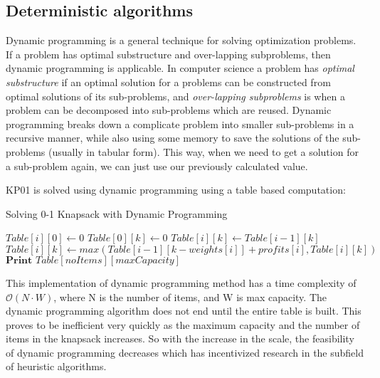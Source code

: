 \documentclass[titlepage]{article}
\begin{document}
\subsection*{Deterministic algorithms}
Dynamic programming is a general technique for solving optimization problems. If a problem has optimal substructure and over-lapping subproblems, then dynamic programming is applicable. In computer science 
a problem has \emph{optimal substructure} if an optimal solution for a problems can be constructed from optimal solutions of its sub-problems, and \emph{over-lapping subproblems} is when a problem can be decomposed into sub-problems which are reused. Dynamic programming breaks down a complicate problem into smaller sub-problems in a recursive manner, while also using some memory to save the solutions of the sub-problems (usually in tabular form). This way, when we need to get a solution for a sub-problem again, we can just use our previously calculated value. 

KP01 is solved using dynamic programming using a table based computation:

\begin{breakablealgorithm}
\caption{Solving 0-1 Knapsack with Dynamic Programming}\label{dp}
    \begin{algorithmic}[1]
         \Comment{\textcolor{blue}{If no items, then profit = 0}}
            \State $Table[i][0] \gets 0 $ 
        \EndFor
         \Comment{\textcolor{blue}{If no capacity, then profit = 0}}
            \State $Table[0][k] \gets 0 $
        \EndFor
                \State $Table[i][k] \gets Table[i-1][k]$  
                    \State $Table[i][k] \gets max(Table[i-1][k-weights[i]] + profits[i], Table[i][k]) $
                \EndIf
            \EndFor
        \EndFor
        \State $\textbf{Print } Table[noItems][maxCapacity] $
    \end{algorithmic}
\end{breakablealgorithm}

\vskip 0.5cm

This implementation of dynamic programming method has a time complexity of $\mathcal{O}(N\cdot W)$, where N is the number of items, and W is max capacity. The dynamic programming algorithm does not end until the entire table is built. This proves to be inefficient very quickly as the maximum capacity and the number of items in the knapsack increases. So with the increase in the scale, the feasibility of dynamic programming decreases which has incentivized research in the subfield of heuristic algorithms.
\end{document}
